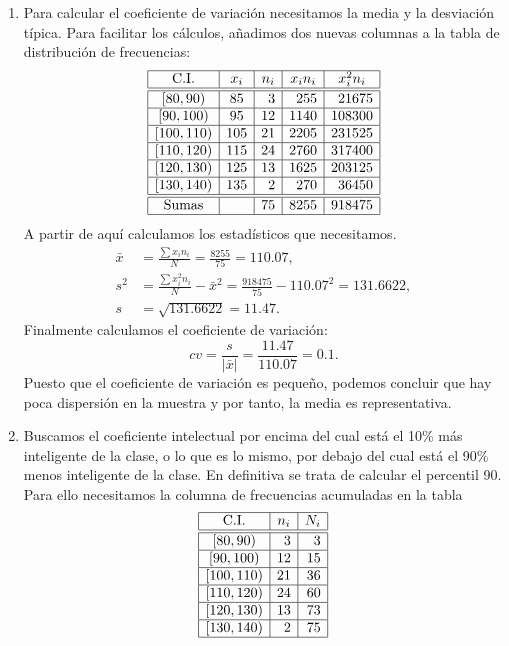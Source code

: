 {\begin{enumerate}
\item Para calcular el coeficiente de variación necesitamos la media y la desviación típica.
Para facilitar los cálculos, añadimos dos nuevas columnas a la tabla de distribución de frecuencias:
\[
\begin{array}{|c|c|r|r|r|}
\hline
   \textrm{C.I.}   & x_i & \multicolumn{1}{c|}{n_i} & \multicolumn{1}{c|}{x_in_i} & \multicolumn{1}{c|}{x_i^2n_i}\\
\hline\hline
  [80,90)  &  85  &   3       & 255 & 21675 \\
\hline
 [90,100)  &  95 &    12       & 1140 & 108300 \\
\hline
 [100,110) &  105 &    21       & 2205 & 231525\\
\hline
 [110,120) &  115 &    24       & 2760 & 317400\\
\hline
 [120,130) &  125 &    13       & 1625 & 203125\\
\hline
 [130,140) &  135 &     2       & 270 & 36450\\
\hline\hline
 \textrm{Sumas} &  & 75 & 8255 & 918475 \\
\hline
\end{array}
\]
A partir de aquí calculamos los estadísticos que necesitamos.
\begin{align*}
\bar{x} & = \frac{\sum x_in_i}{N}=\frac{8255}{75}=110.07,\\
s^2 & =\frac{\sum x_i^2n_i}{N}-\bar{x}^2= \frac{918475}{75}-110.07^2=131.6622,\\
s & =\sqrt{131.6622}=11.47.
\end{align*}
Finalmente calculamos el coeficiente de variación:
\[
cv=\frac{s}{|\bar{x}|}=\frac{11.47}{110.07}= 0.1.
\]
Puesto que el coeficiente de variación es pequeño, podemos concluir que hay poca dispersión en la muestra y por tanto, la media es representativa.

\item Buscamos el coeficiente intelectual por encima del cual está el 10\% más inteligente de la clase, o lo que es lo mismo, por debajo del cual está el 90\% menos inteligente de la clase. En definitiva se trata de calcular el percentil 90. 
Para ello necesitamos la columna de frecuencias acumuladas en la tabla
\[
\begin{array}{|c|r|r|}
\hline
   \textrm{C.I.}    & \multicolumn{1}{c|}{n_i} & \multicolumn{1}{c|}{N_i} \\
\hline\hline
  [80,90)  &       3       & 3 \\
\hline
 [90,100)  &      12       & 15 \\
\hline
 [100,110) &      21       & 36 \\
\hline
 [110,120) &      24       & 60 \\
\hline
 [120,130) &      13       & 73 \\
\hline
 [130,140) &       2       & 75 \\
\hline
\end{array}
\]


\end{enumerate}}
